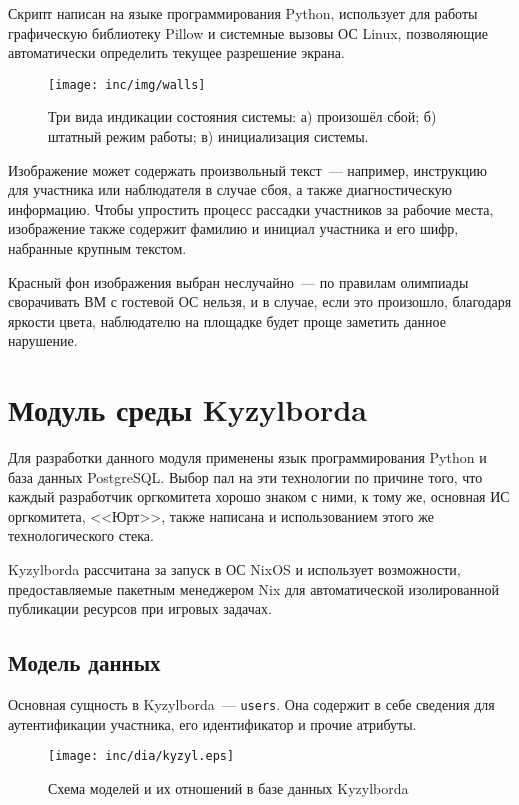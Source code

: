 Скрипт написан на языке программирования Python, использует для работы графическую библиотеку Pillow и системные вызовы ОС Linux, позволяющие автоматически определить текущее разрешение экрана.

\begin{figure}[h]
  \centering
  \texttt{[image: inc/img/walls]}
  \caption{Три вида индикации состояния системы: а) произошёл сбой; б) штатный режим работы; в) инициализация системы.}
  \label{fig:walls}
\end{figure}

Изображение может содержать произвольный текст~--- например, инструкцию для участника или наблюдателя в случае сбоя, а также диагностическую информацию. Чтобы упростить процесс рассадки участников за рабочие места, изображение также содержит фамилию и инициал участника и его шифр, набранные крупным текстом.

Красный фон изображения выбран неслучайно~--- по правилам олимпиады сворачивать ВМ с гостевой ОС нельзя, и в случае, если это произошло, благодаря яркости цвета, наблюдателю на площадке будет проще заметить данное нарушение.




\section{Модуль среды Kyzylborda}

Для разработки данного модуля применены язык программирования Python и база данных PostgreSQL. Выбор пал на эти технологии по причине того, что каждый разработчик оргкомитета хорошо знаком с ними, к тому же, основная ИС оргкомитета, <<Юрт>>, также написана и использованием этого же технологического стека.

Kyzylborda рассчитана за запуск в ОС NixOS и использует возможности, предоставляемые пакетным менеджером Nix для автоматической изолированной публикации ресурсов при игровых задачах.


\subsection{Модель данных}

Основная сущность в Kyzylborda~--- \texttt{users}. Она содержит в себе сведения для аутентификации участника, его идентификатор и прочие атрибуты.

\begin{figure}[h!]
  \centering
  \texttt{[image: inc/dia/kyzyl.eps]}
  \caption{Схема моделей и их отношений в базе данных Kyzylborda}
  \label{fig:kyzyl}
\end{figure}


